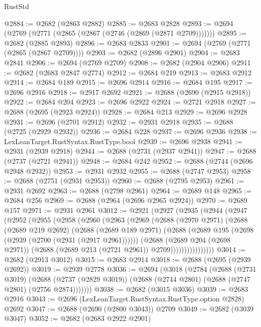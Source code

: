 \begin{lexlean}{RustStd}
\begin{coremodule}
@2884 := @2682 (@2863 @2882)
@2885 := @2683 @2828
@2893 := @2694 (@2769 (@2771 (@2865 (@2867 (@2746 (@2869 (@2871 @2709)))))))
@2895 := @2682 (@2885 @2893)
@2896 := @2683 @2833
@2901 := @2694 (@2769 (@2771 (@2865 (@2867 @2709))))
@2903 := @2682 (@2896 @2901)
@2904 := @2683 @2841
@2906 := @2694 (@2769 @2709)
@2908 := @2682 (@2904 @2906)
@2911 := @2682 (@2683 @2847 @2774)
@2912 := @2684 @219
@2913 := @2683 @2912
@2914 := @2684 @189
@2915 := @2696 @2914
@2916 := @2684 @195
@2917 := @2696 @2916
@2918 := @2917 @2692
@2921 := @2688 (@2690 (@2915 @2918))
@2922 := @2684 @204
@2923 := @2696 @2922
@2924 := @2721 @2918
@2927 := @2688 (@2695 (@2923 @2924))
@2928 := @2684 @213
@2929 := @2696 @2928
@2931 := @2696 (@2701 @2912)
@2932 := @2931 @2918
@2935 := @2688 (@2725 (@2929 @2932))
@2936 := @2684 @228
@2937 := @2696 @2936
@2938 := LexLeanTarget.RustSyntax.RustType.bool
@2939 := @2696 @2938
@2941 := @2931 (@2939 @2918)
@2944 := @2688 (@2731 (@2937 @2941))
@2947 := @2688 (@2737 (@2721 @2941))
@2948 := @2684 @242
@2952 := @2688 (@2744 (@2696 @2948 @2932))
@2953 := @2931 @2932
@2955 := @2688 (@2747 @2953)
@2958 := @2688 (@2751 (@2931 @2953))
@2960 := @2688 (@2795 @2953)
@2961 := @2931 @2692
@2963 := @2688 (@2798 @2961)
@2964 := @2689 @148
@2965 := @2684 @256
@2969 := @2688 (@2964 (@2696 @2965 @2924))
@2970 := @2689 @157
@2971 := @2931 @2961
@3012 := @2921
    (@2927
      (@2935
        (@2944
          (@2947
            (@2952
              (@2955
                (@2958
                  (@2960
                    (@2963
                      (@2969
                        (@2688
                          (@2970 @2971)
                          (@2688
                            (@2689 @219 @2692)
                            (@2688
                              (@2689 @189 @2971)
                              (@2688
                                (@2689 @195 (@2698 (@2939 (@2700 (@2931 (@2917 @2961))))))
                                (@2688
                                  (@2689 @204 (@2698 @2971))
                                  (@2688 (@2689 @213 (@2721 @2961)) @2709))))))))))))))))
@3014 := @2682 (@2913 @3012)
@3015 := @2683 @2914
@3018 := @2688 (@2695 (@2939 @2692))
@3019 := @2939 @2778
@3036 := @2694
    (@3018
      (@2784
        (@2688
          (@2731 @3019)
          (@2688 (@2737 (@2829 @3019)) (@2688 (@2744 @2801) (@2688 (@2747 @2801) (@2756 @2874)))))))
@3038 := @2682 (@3015 @3036)
@3039 := @2683 @2916
@3043 := @2696 (LexLeanTarget.RustSyntax.RustType.option @2828) @2692
@3047 := @2688 (@2690 (@2800 @3043)) @2709
@3049 := @2682 (@3039 @3047)
@3052 := @2682 (@2683 @2922 @2901)

\end{coremodule}
\end{lexlean}
